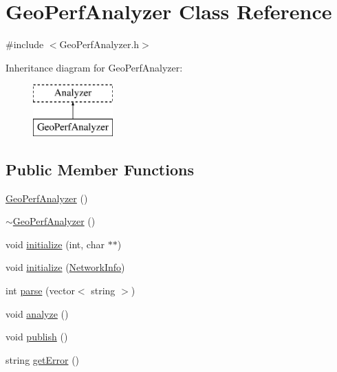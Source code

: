 \hypertarget{class_geo_perf_analyzer}{}\section{Geo\+Perf\+Analyzer Class Reference}
\label{class_geo_perf_analyzer}


{\ttfamily \#include $<$Geo\+Perf\+Analyzer.\+h$>$}

Inheritance diagram for Geo\+Perf\+Analyzer\+:\begin{figure}[H]
\begin{center}
\leavevmode
\includegraphics[height=2.000000cm]{class_geo_perf_analyzer}
\end{center}
\end{figure}
\subsection*{Public Member Functions}
\begin{DoxyCompactItemize}
\item 
\mbox{\hyperlink{class_geo_perf_analyzer_ac0414642cebe142c3d76c826978884c2}{Geo\+Perf\+Analyzer}} ()
\item 
\mbox{\hyperlink{class_geo_perf_analyzer_a91e810c076f5a79577698240af7c8dfd}{$\sim$\+Geo\+Perf\+Analyzer}} ()
\item 
void \mbox{\hyperlink{class_geo_perf_analyzer_aac29ab75a50ab1df9b9d49049ba96274}{initialize}} (int, char $\ast$$\ast$)
\item 
void \mbox{\hyperlink{class_geo_perf_analyzer_a4716557bfe06817b5d1c6c15e6a4e141}{initialize}} (\mbox{\hyperlink{struct_network_info}{Network\+Info}})
\item 
int \mbox{\hyperlink{class_geo_perf_analyzer_a03fcf5846ad4963692df9367e65469df}{parse}} (vector$<$ string $>$)
\item 
void \mbox{\hyperlink{class_geo_perf_analyzer_af62a34fd2e518e4505512318d2e56410}{analyze}} ()
\item 
void \mbox{\hyperlink{class_geo_perf_analyzer_af79f2adf101667172fd4b6c42459003c}{publish}} ()
\item 
string \mbox{\hyperlink{class_geo_perf_analyzer_a161e1261df25903eda37efe049975741}{get\+Error}} ()
\end{DoxyCompactItemize}
